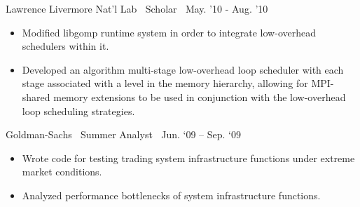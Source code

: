 {Lawrence Livermore Nat’l Lab$\>$$\>$$\>$$\>$Scholar$\>$$\>$$\>$$\>$May. '10 - Aug. '10}
\begin{itemize}
\item Modified libgomp runtime system in order to integrate low-overhead schedulers within it.
\item Developed an algorithm multi-stage low-overhead loop scheduler with each stage associated with a level in the memory hierarchy, allowing for MPI-shared memory extensions to be used in conjunction with the low-overhead loop scheduling strategies.
\end{itemize}
{Goldman-Sachs$\>\>\>\>$Summer Analyst$\>\>\>\>$Jun. ‘09 – Sep. ‘09}
\vspace*{-0.0in}
\begin{itemize}
\item Wrote code for testing trading system infrastructure functions under extreme market conditions.
\item Analyzed performance bottlenecks of system infrastructure functions.
\end{itemize}
